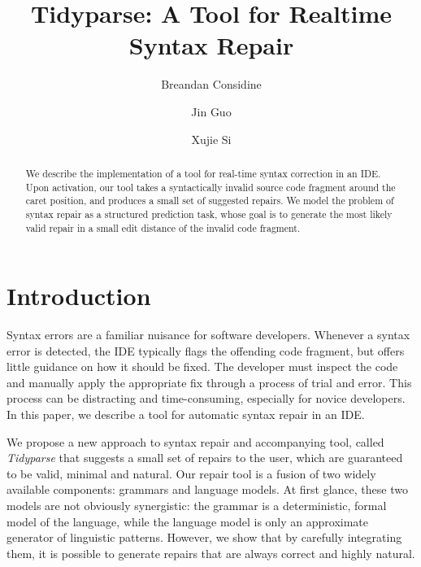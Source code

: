 \documentclass[runningheads]{llncs}
\begin{document}
%
\title{Tidyparse: A Tool for Realtime Syntax Repair}
%
%
\author{Breandan Considine \and
Jin Guo\and
Xujie Si}
%
%
%
\maketitle              %
%
\begin{abstract}
  We describe the implementation of a tool for real-time syntax correction in an IDE. Upon activation, our tool takes a syntactically invalid source code fragment around the caret position, and produces a small set of suggested repairs. We model the problem of syntax repair as a structured prediction task, whose goal is to generate the most likely valid repair in a small edit distance of the invalid code fragment.
\end{abstract}

\section{Introduction}

Syntax errors are a familiar nuisance for software developers. Whenever a syntax error is detected, the IDE typically flags the offending code fragment, but offers little guidance on how it should be fixed. The developer must inspect the code and manually apply the appropriate fix through a process of trial and error. This process can be distracting and time-consuming, especially for novice developers. In this paper, we describe a tool for automatic syntax repair in an IDE.

We propose a new approach to syntax repair and accompanying tool, called \textit{Tidyparse} that suggests a small set of repairs to the user, which are guaranteed to be valid, minimal and natural. Our repair tool is a fusion of two widely available components: grammars and language models. At first glance, these two models are not obviously synergistic: the grammar is a deterministic, formal model of the language, while the language model is only an approximate generator of linguistic patterns. However, we show that by carefully integrating them, it is possible to generate repairs that are always correct and highly natural.
\end{document}
